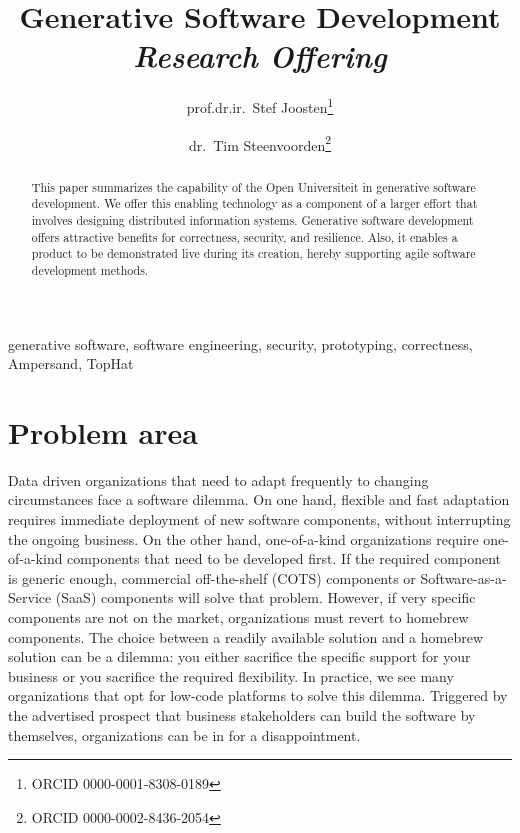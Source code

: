 \documentclass{elsarticle}
\begin{document}
% 

\title{Generative Software Development\\{\em\normalsize Research Offering}}
\author{prof.dr.ir.\ Stef Joosten\footnote{ORCID 0000-0001-8308-0189}}
\author{dr.\ Tim Steenvoorden\footnote{ORCID 0000-0002-8436-2054}}
\address{Open Universiteit Nederland, Heerlen, the Netherlands}

\begin{abstract}
    This paper summarizes the capability of the Open Universiteit in generative software development.
    We offer this enabling technology as a component of a larger effort that involves designing distributed information systems.
    Generative software development offers attractive benefits for correctness, security, and resilience.
    Also, it enables a product to be demonstrated live during its creation,
    hereby supporting agile software development methods.
\end{abstract}

\begin{keyword}
    generative software, software engineering, security, prototyping, correctness, Ampersand, TopHat
\end{keyword}
\maketitle

\section{Problem area}
   Data driven organizations that need to adapt frequently to changing circumstances face a software dilemma.
   On one hand, flexible and fast adaptation requires immediate deployment of new software components, without interrupting the ongoing business.
   On the other hand, one-of-a-kind organizations require one-of-a-kind components that need to be developed first.
   If the required component is generic enough, commercial off-the-shelf (COTS) components or Software-as-a-Service (SaaS) components will solve that problem.
   However, if very specific components are not on the market, organizations must revert to homebrew components.
   The choice between a readily available solution and a homebrew solution can be a dilemma:
   you either sacrifice the specific support for your business or you sacrifice the required flexibility.
   In practice, we see many organizations that opt for low-code platforms to solve this dilemma.
   Triggered by the advertised prospect that business stakeholders can build the software by themselves,
   organizations can be in for a disappointment.
\end{document}
